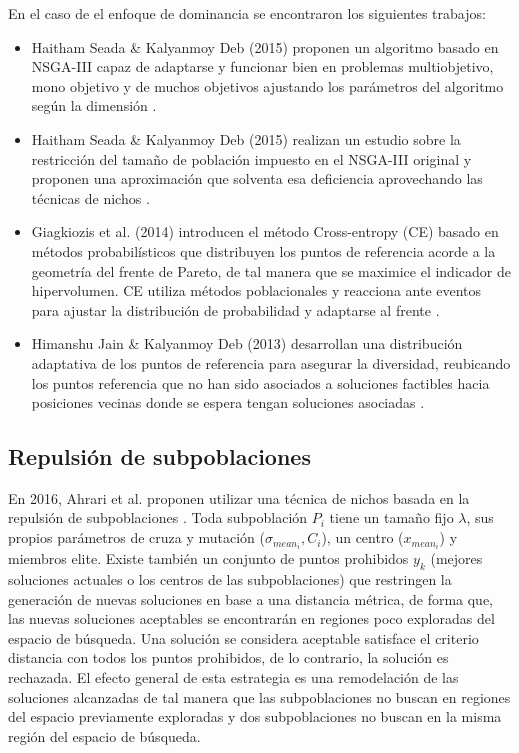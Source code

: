 \documentclass[letterpaper,10pt]{article}
\begin{document}
En el caso de el enfoque de dominancia se encontraron los siguientes trabajos:

\begin{itemize}
 \item Haitham Seada \& Kalyanmoy Deb (2015) proponen un algoritmo basado en NSGA-III capaz de adaptarse y funcionar bien en problemas multiobjetivo, mono objetivo y de muchos objetivos ajustando los parámetros del algoritmo según la dimensión \cite{a0ecee762d9f4867a9ded8de598c732e}.
 \item Haitham Seada \& Kalyanmoy Deb (2015) realizan un estudio sobre la restricción del tamaño de población impuesto en el NSGA-III original y proponen una aproximación que solventa esa deficiencia aprovechando las técnicas de nichos \cite{7257251}.
 \item Giagkiozis et al. (2014) introducen el método Cross-entropy (CE) basado en métodos probabilísticos que distribuyen los puntos de referencia acorde a la geometría del frente de Pareto, de tal manera que se maximice el indicador de hipervolumen. CE utiliza métodos poblacionales y reacciona ante eventos para ajustar la distribución de probabilidad y adaptarse al frente \cite{Giagkiozis2014363}.
 \item Himanshu Jain \& Kalyanmoy Deb (2013) desarrollan una distribución adaptativa de los puntos de referencia para asegurar la diversidad, reubicando los puntos referencia que no han sido asociados a soluciones factibles hacia posiciones vecinas donde se espera tengan soluciones asociadas \cite{jain2013improved}.
\end{itemize}

\subsection{Repulsión de subpoblaciones}

En 2016, Ahrari et al. proponen utilizar una técnica de nichos basada en la repulsión de subpoblaciones \cite{ahrari2016multimodal}. Toda subpoblación $P_i$ tiene un tamaño fijo $\lambda$,
sus propios parámetros de cruza y mutación ($\sigma_{mean_i},C_i$), un centro ($x_{mean_i}$) y miembros elite. Existe también un conjunto de puntos prohibidos $y_k$
(mejores soluciones actuales o los centros de las subpoblaciones) que restringen la generación de nuevas soluciones en base a una distancia métrica, de forma que, las nuevas soluciones aceptables
se encontrarán en regiones poco exploradas del espacio de búsqueda. Una solución se considera aceptable satisface el criterio distancia con todos los puntos prohibidos, de lo contrario,
la solución es rechazada. El efecto general de esta estrategia es una remodelación de las soluciones alcanzadas de tal manera que las subpoblaciones no buscan en regiones del espacio
previamente exploradas y dos subpoblaciones no buscan en la misma región del espacio de búsqueda.
\newline
\end{document}
